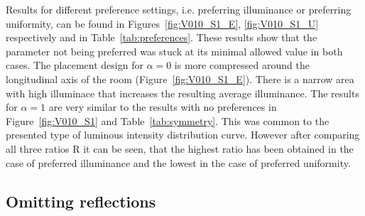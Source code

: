 Results for different preference settings, i.e. preferring illuminance or preferring uniformity, can be found in Figures~\ref{fig:V010_S1_E}, \ref{fig:V010_S1_U} respectively and in Table~\ref{tab:preferences}. These results show that the parameter not being preferred was stuck at its minimal allowed value in both cases. The placement design for $\alpha = 0$ is more compressed around the longitudinal axis of the room (Figure~\ref{fig:V010_S1_E}). There is a narrow area with high illuminace that increases the resulting average illuminance. The results for $\alpha = 1$ are very similar to the results with no preferences in Figure~\ref{fig:V010_S1} and Table~\ref{tab:symmetry}. This was common to the presented type of luminous intensity distribution curve. However after comparing all three ratios R it can be seen, that the highest ratio has been obtained in the case of preferred illuminance and the lowest in the case of preferred uniformity.

\subsection{Omitting reflections}


